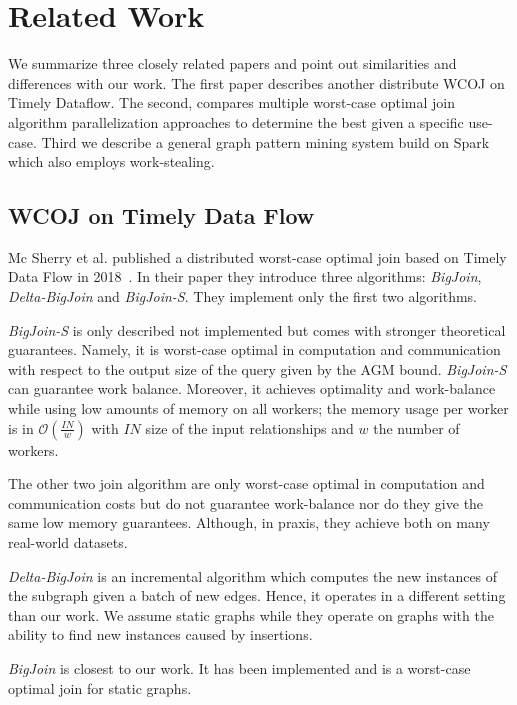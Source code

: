 \section{Related Work} \label{sec:related-work}
We summarize three closely related papers and point out similarities and differences with our
work.
The first paper describes another distribute \textsc{WCOJ} on Timely Dataflow.
The second, compares multiple worst-case optimal join algorithm parallelization
approaches to determine the best given a specific use-case.
Third we describe a general graph pattern mining system build on Spark which also
employs work-stealing.

\subsection{\textsc{WCOJ} on Timely Data Flow}\label{subsec:wcoj-timely-data-flow}

Mc Sherry et al. published a distributed worst-case optimal join based on Timely Data Flow in 2018~\cite{ammar2018distributed,naiad}.
In their paper they introduce three algorithms: \textit{BigJoin}, \textit{Delta-BigJoin} and \textit{BigJoin-S}.
They implement only the first two algorithms.

\textit{BigJoin-S} is only described not implemented but comes with stronger theoretical guarantees.
Namely, it is worst-case optimal in computation and communication with respect to the output size of the query
given by the AGM bound.
\textit{BigJoin-S} can guarantee work balance.
Moreover, it achieves optimality and work-balance while using low amounts of memory on all workers;
the memory usage per worker is in $\mathcal{O} (\frac{IN}{w})$ with $IN$ size of the input relationships and $w$ the number of workers.

The other two join algorithm are only worst-case optimal in computation and communication costs but
do not guarantee work-balance nor do they give the same low memory guarantees.
Although, in praxis, they achieve both on many real-world datasets.

\textit{Delta-BigJoin} is an incremental algorithm which computes the new instances of the subgraph given a batch of new edges.
Hence, it operates in a different setting than our work.
We assume static graphs while they operate on graphs with the ability to find new instances caused by insertions.

\textit{BigJoin} is closest to our work.
It has been implemented and is a worst-case optimal join for static graphs.

